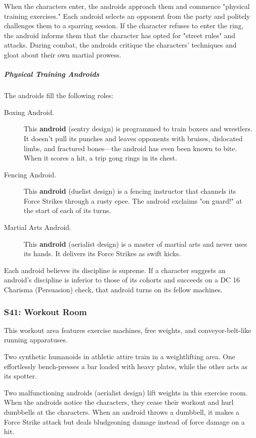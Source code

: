 \documentclass[10pt,a4paper,twoside,bg=print,twocolumn,openany,nodeprecatedcode]{dndbook}
\begin{document}
When the characters enter, the androids approach them and commence "physical training exercises." Each android selects an opponent from the party and politely challenges them to a sparring session. If the character refuses to enter the ring, the android informs them that the character has opted for "street rules" and attacks. During combat, the androids critique the characters' techniques and gloat about their own martial prowess.

\subparagraph{Physical Training Androids}
The androids fill the following roles:


\begin{description}
\item[Boxing Android.]
This \textbf{android} (sentry design) is programmed to train boxers and wrestlers. It doesn't pull its punches and leaves opponents with bruises, dislocated limbs, and fractured bones—the android has even been known to bite. When it scores a hit, a trip gong rings in its chest.
\item[Fencing Android.]
This \textbf{android} (duelist design) is a fencing instructor that channels its Force Strikes through a rusty epee. The android exclaims "on guard!" at the start of each of its turns.
\item[Martial Arts Android.]
This \textbf{android} (aerialist design) is a master of martial arts and never uses its hands. It delivers its Force Strikes as swift kicks.
\end{description}

Each android believes its discipline is supreme. If a character suggests an android's discipline is inferior to those of its cohorts and succeeds on a DC 16 Charisma (Persuasion) check, that android turns on its fellow machines.

\subsubsection{S41: Workout Room}
\begin{DndReadAloud}{}
This workout area features exercise machines, free weights, and conveyor-belt-like running apparatuses.

Two synthetic humanoids in athletic attire train in a weightlifting area. One effortlessly bench-presses a bar loaded with heavy plates, while the other acts as its spotter.

\end{DndReadAloud}

Two malfunctioning androids (aerialist design) lift weights in this exercise room. When the androids notice the characters, they cease their workout and hurl dumbbells at the characters. When an android throws a dumbbell, it makes a Force Strike attack but deals bludgeoning damage instead of force damage on a hit.
\end{document}
